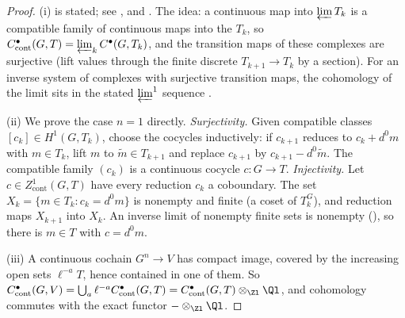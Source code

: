 \begin{proof}
(i) is stated; see \cite[Section 2]{Tate95}, \cite[Chapter II, Section 7]{NSW} and \cite[Appendix B]{Rubin}. The idea: a continuous map into $\varprojlim T_k$ is a
compatible family of continuous maps into the $T_k$, so $C^\bullet_{\mathrm{cont}}(G,T)=\varprojlim_kC^\bullet(G,T_k)$, and the transition maps of these complexes are
surjective (lift values through the finite discrete $T_{k+1}\to T_k$ by a section). For an inverse system of complexes with surjective transition maps,
the cohomology of the limit sits in the stated $\varprojlim^1$ sequence \cite[Theorem 3.5.8]{Weibel}.

(ii) We prove the case $n=1$ directly. \emph{Surjectivity.} Given compatible classes $[c_k]\in H^1(G,T_k)$, choose the cocycles inductively: if $c_{k+1}$ reduces
to $c_k+d^0m$ with $m\in T_k$, lift $m$ to $\tilde m\in T_{k+1}$ and replace $c_{k+1}$ by $c_{k+1}-d^0\tilde m$. The compatible family $(c_k)$ is a continuous cocycle
$c\colon G\to T$. \emph{Injectivity.} Let $c\in Z^1_{\mathrm{cont}}(G,T)$ have every reduction $c_k$ a coboundary. The set $X_k=\{m\in T_k:c_k=d^0m\}$ is nonempty and finite (a
coset of $T_k^G$), and reduction maps $X_{k+1}$ into $X_k$. An inverse limit of nonempty finite sets is nonempty (), so there is $m\in T$ with
$c=d^0m$.

(iii) A continuous cochain $G^n\to V$ has compact image, covered by the increasing open sets $\ell^{-a}T$, hence contained in one of them. So
$C^\bullet_{\mathrm{cont}}(G,V)=\bigcup_a\ell^{-a}C^\bullet_{\mathrm{cont}}(G,T)=C^\bullet_{\mathrm{cont}}(G,T)\otimes_{\Zl}\Ql$, and cohomology commutes with the exact functor $-\otimes_{\Zl}\Ql$.
\end{proof}

